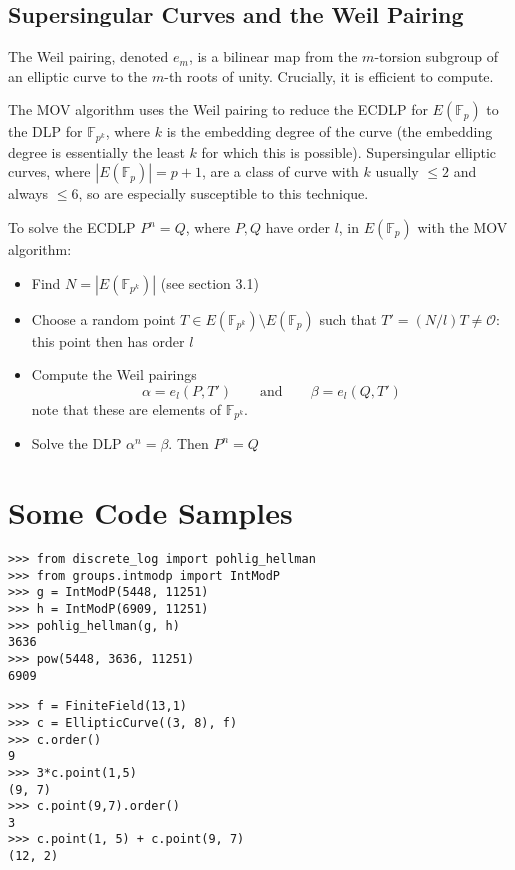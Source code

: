 \documentclass[a4paper]{article}
\begin{document}
\subsection{Supersingular Curves and the Weil Pairing}
The Weil pairing, denoted $e_m$, is a bilinear map from the $m$-torsion subgroup of an elliptic curve to the $m$-th roots of unity. Crucially, it is efficient to compute.

The MOV algorithm uses the Weil pairing to reduce the ECDLP for $E(\mathbb{F}_p)$ to the DLP for $\mathbb{F}_{p^k}$, where $k$ is the embedding degree of the curve (the embedding degree is essentially the least $k$ for which this is possible). Supersingular elliptic curves, where $|E(\mathbb{F}_p)| = p + 1$, are a class of curve with $k$ usually $\leq 2$ and always $\leq 6$, so are especially susceptible to this technique.

To solve the ECDLP $P^n = Q$, where $P,Q$ have order $l$, in $E(\mathbb{F}_p)$ with the MOV algorithm:
\begin{itemize}
	\item Find $N = |E(\mathbb{F}_{p^k})|$ (see section 3.1)
	\item Choose a random point $T \in E(\mathbb{F}_{p^k}) \setminus E(\mathbb{F}_{p})$ such that $T' = (N/l)T \neq \mathcal{O}$: this point then has order $l$
	\item Compute the Weil pairings $$\alpha = e_l(P, T') \qquad \text{and} \qquad \beta = e_l(Q, T')$$ note that these are elements of $\mathbb{F}_{p^k}$.
	\item Solve the DLP $\alpha^n=\beta$. Then $P^n = Q$
\end{itemize}
\appendix
\section{Some Code Samples}

\begin{lstlisting}[caption=Solving the DLP in $\mathbb{F}_{11251}$]
>>> from discrete_log import pohlig_hellman
>>> from groups.intmodp import IntModP
>>> g = IntModP(5448, 11251)
>>> h = IntModP(6909, 11251)
>>> pohlig_hellman(g, h)
3636
>>> pow(5448, 3636, 11251)
6909
\end{lstlisting}

\begin{lstlisting}[caption=Arithmetic in an elliptic curve group]
>>> f = FiniteField(13,1)
>>> c = EllipticCurve((3, 8), f)
>>> c.order()
9
>>> 3*c.point(1,5)
(9, 7)
>>> c.point(9,7).order()
3
>>> c.point(1, 5) + c.point(9, 7)
(12, 2)
\end{lstlisting}
\end{document}
